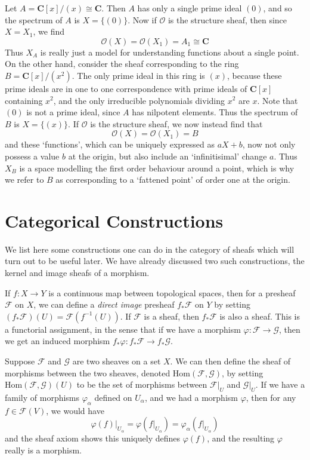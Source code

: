 \begin{example}
    Let $A = \mathbf{C}[x]/(x) \cong \mathbf{C}$. Then $A$ has only a single prime ideal $(0)$, and so the spectrum of $A$ is $X = \{ (0) \}$. Now if $\mathcal{O}$ is the structure sheaf, then since $X = X_1$, we find
    \[ \mathcal{O}(X) = \mathcal{O}(X_1) = A_1 \cong \mathbf{C} \]
    Thus $X_A$ is really just a model for understanding functions about a single point. On the other hand, consider the sheaf corresponding to the ring $B = \mathbf{C}[x]/(x^2)$. The only prime ideal in this ring is $(x)$, because these prime ideals are in one to one correspondence with prime ideals of $\mathbf{C}[x]$ containing $x^2$, and the only irreducible polynomials dividing $x^2$ are $x$. Note that $(0)$ is not a prime ideal, since $A$ has nilpotent elements. Thus the spectrum of $B$ is $X = \{ (x) \}$. If $\mathcal{O}$ is the structure sheaf, we now instead find that
    \[ \mathcal{O}(X) = \mathcal{O}(X_1) = B \]
    and these `functions', which can be uniquely expressed as $aX + b$, now not only possess a value $b$ at the origin, but also include an `infinitisimal' change $a$. Thus $X_B$ is a space modelling the first order behaviour around a point, which is why we refer to $B$ as corresponding to a `fattened point' of order one at the origin.
\end{example}

\section{Categorical Constructions}

We list here some constructions one can do in the category of sheafs which will turn out to be useful later. We have already discussed two such constructions, the kernel and image sheafs of a morphism.

\begin{example}
    If $f: X \to Y$ is a continuous map between topological spaces, then for a presheaf $\mathcal{F}$ on $X$, we can define a \emph{direct image} presheaf $f_* \mathcal{F}$ on $Y$ by setting $(f_* \mathcal{F})(U) = \mathcal{F}(f^{-1}(U))$. If $\mathcal{F}$ is a sheaf, then $f_* \mathcal{F}$ is also a sheaf. This is a functorial assignment, in the sense that if we have a morphism $\varphi: \mathcal{F} \to \mathcal{G}$, then we get an induced morphism $f_* \varphi: f_* \mathcal{F} \to f_* \mathcal{G}$.
\end{example}

Suppose $\mathcal{F}$ and $\mathcal{G}$ are two sheaves on a set $X$. We can then define the sheaf of morphisms between the two sheaves, denoted $\text{Hom}(\mathcal{F}, \mathcal{G})$, by setting $\text{Hom}(\mathcal{F}, \mathcal{G})(U)$ to be the set of morphisms between $\mathcal{F}|_U$ and $\mathcal{G}|_U$. If we have a family of morphisms $\varphi_\alpha$ defined on $U_\alpha$, and we had a morphism $\varphi$, then for any $f \in \mathcal{F}(V)$, we would have
%
\[ \varphi(f)|_{U_\alpha} = \varphi \left( f|_{U_\alpha} \right) = \varphi_\alpha \left( f|_{U_\alpha} \right) \]
%
and the sheaf axiom shows this uniquely defines $\varphi(f)$, and the resulting $\varphi$ really is a morphism.

